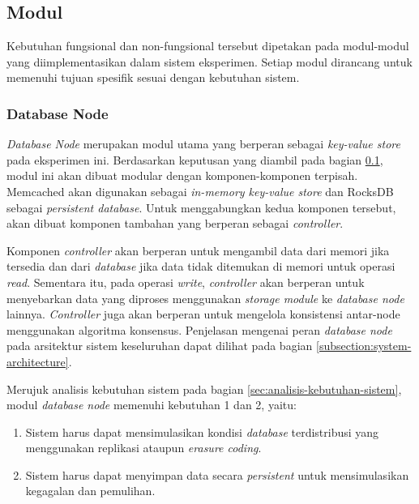 \subsection{Modul}
\label{subsection:modules}

Kebutuhan fungsional dan non-fungsional tersebut dipetakan pada modul-modul yang diimplementasikan dalam sistem eksperimen. Setiap modul dirancang untuk memenuhi tujuan spesifik sesuai dengan kebutuhan sistem.

\subsubsection{Database Node}
\label{subsubsection:database-node}

\textit{Database Node} merupakan modul utama yang berperan sebagai \textit{key-value store} pada eksperimen ini. Berdasarkan keputusan yang diambil pada bagian \ref{subsection:modules}, modul ini akan dibuat modular dengan komponen-komponen terpisah. Memcached akan digunakan sebagai \textit{in-memory key-value store} dan RocksDB sebagai \textit{persistent database}. Untuk menggabungkan kedua komponen tersebut, akan dibuat komponen tambahan yang berperan sebagai \textit{controller}.

Komponen \textit{controller} akan berperan untuk mengambil data dari memori jika tersedia dan dari \textit{database} jika data tidak ditemukan di memori untuk operasi \textit{read}. Sementara itu, pada operasi \textit{write}, \textit{controller} akan berperan untuk menyebarkan data yang diproses menggunakan \textit{storage module} ke \textit{database node} lainnya. \textit{Controller} juga akan berperan untuk mengelola konsistensi antar-node menggunakan algoritma konsensus. Penjelasan mengenai peran \textit{database node} pada arsitektur sistem keseluruhan dapat dilihat pada bagian \ref{subsection:system-architecture}.

Merujuk analisis kebutuhan sistem pada bagian \ref{sec:analisis-kebutuhan-sistem}, modul \textit{database node} memenuhi kebutuhan 1 dan 2, yaitu:

\begin{enumerate}
    \item Sistem harus dapat mensimulasikan kondisi \textit{database} terdistribusi yang menggunakan replikasi ataupun \textit{erasure coding}.
    \item Sistem harus dapat menyimpan data secara \textit{persistent} untuk mensimulasikan kegagalan dan pemulihan.
\end{enumerate}

